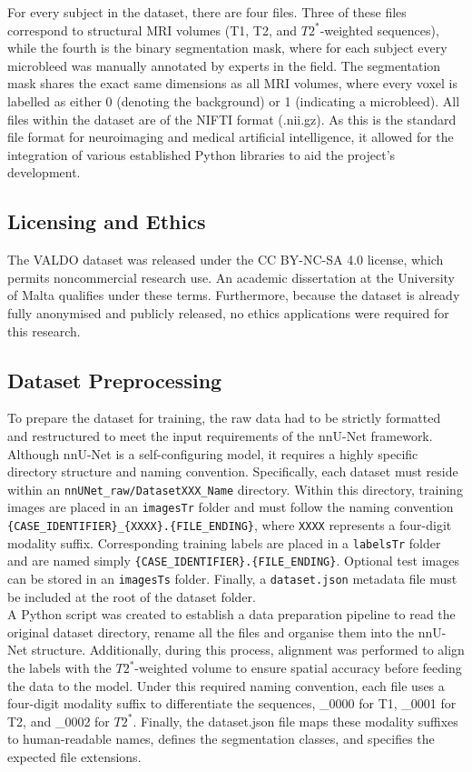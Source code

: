\documentclass{aifyp}
\begin{document}
For every subject in the dataset, there are four files. Three of these files correspond to structural MRI volumes (T1, T2, and $T2^*$-weighted sequences), while the fourth is the binary segmentation mask, where for each subject every microbleed was manually annotated by experts in the field. The segmentation mask shares the exact same dimensions as all MRI volumes, where every voxel is labelled as either 0 (denoting the background) or 1 (indicating a microbleed). All files within the dataset are of the NIFTI format (.nii.gz).  As this is the standard file format for neuroimaging and medical artificial intelligence, it allowed for the integration of various established Python libraries to aid the project's development.\cite{valdoDataset}

\subsection{Licensing and Ethics}
The VALDO dataset was released under the CC BY-NC-SA 4.0 license, which permits noncommercial research use. An academic dissertation at the University of Malta qualifies under these terms. Furthermore, because the dataset is already fully anonymised and publicly released, no ethics applications were required for this research.

\subsection{Dataset Preprocessing}
To prepare the dataset for training, the raw data had to be strictly formatted and restructured to meet the input requirements of the nnU-Net framework. Although nnU-Net is a self-configuring model, it requires a highly specific directory structure and naming convention. Specifically, each dataset must reside within an \texttt{nnUNet\_raw/DatasetXXX\_Name} directory. Within this directory, training images are placed in an \texttt{imagesTr} folder and must follow the naming convention \texttt{\{CASE\_IDENTIFIER\}\_\{XXXX\}.\{FILE\_ENDING\}}, where \texttt{XXXX} represents a four-digit modality suffix. Corresponding training labels are placed in a \texttt{labelsTr} folder and are named simply \texttt{\{CASE\_IDENTIFIER\}.\{FILE\_ENDING\}}. Optional test images can be stored in an \texttt{imagesTs} folder. Finally, a \texttt{dataset.json} metadata file must be included at the root of the dataset folder.\cite{nnUNet}
\\

A Python script was created to establish a data preparation pipeline to read the original dataset directory, rename all the files and organise them into the nnU-Net structure. Additionally, during this process, alignment was performed to align the labels with the $T2^*$-weighted volume to ensure spatial accuracy before feeding the data to the model. Under this required naming convention, each file uses a four-digit modality suffix to differentiate the sequences, \_0000 for T1, \_0001 for T2, and \_0002 for $T2^*$. Finally, the dataset.json file maps these modality suffixes to human-readable names, defines the segmentation classes, and specifies the expected file extensions.
\end{document}
